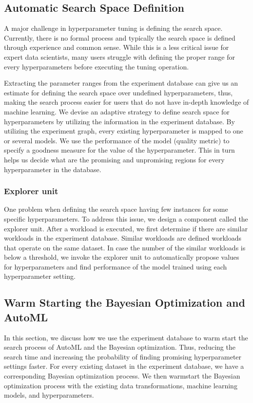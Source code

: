 \subsection{Automatic Search Space Definition}\label{sub-section-automatic-search-definition}
A major challenge in hyperparameter tuning is defining the search space.
Currently, there is no formal process and typically the search space is defined through experience and common sense.
While this is a less critical issue for expert data scientists, many users struggle with defining the proper range for every hyperparameters before executing the tuning operation.

Extracting the parameter ranges from the experiment database can give us an estimate for defining the search space over undefined hyperparameters, thus, making the search process easier for users that do not have in-depth knowledge of machine learning.
We devise an adaptive strategy to define search space for hyperparameters by utilizing the information in the experiment database.
By utilizing the experiment graph, every existing hyperparameter is mapped to one or several models.
We use the performance of the model (quality metric) to specify a goodness measure for the value of the hyperparameter.
This in turn helps us decide what are the promising and unpromising regions for every hyperparameter in the database.

\subsubsection{Explorer unit}
One problem when defining the search space having few instances for some specific hyperparameters.
To address this issue, we design a component called the explorer unit.
After a workload is executed, we first determine if there are similar workloads in the experiment database.
Similar workloads are defined workloads that operate on the same dataset.
In case the number of the similar workloads is below a threshold, we invoke the explorer unit to automatically propose values for hyperparameters and find performance of the model trained using each hyperparameter setting.

\subsection{Warm Starting the Bayesian Optimization and AutoML}
In this section, we discuss how we use the experiment database to warm start the search process of AutoML and the Bayesian optimization.
Thus, reducing the search time and increasing the probability of finding promising hyperparameter settings faster.
For every existing dataset in the experiment database, we have a corresponding Bayesian optimization process.
We then warmstart the Bayesian optimization process with the existing data transformations, machine learning models, and hyperparameters.

